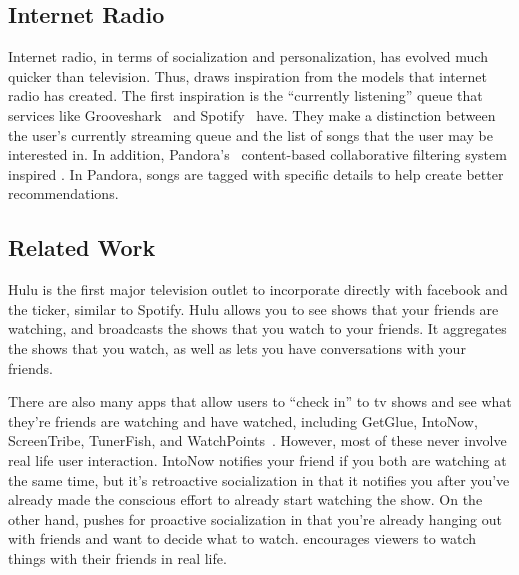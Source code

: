 \subsection{Internet Radio}
Internet radio, in terms of socialization and personalization, has
evolved much quicker than television.  Thus, {\sys} draws inspiration
from the models that internet radio has created.  The first
inspiration is the “currently listening” queue that services like
Grooveshark~\cite{grooveshark} and Spotify~\cite{spotify} have.  They
make a distinction between the user’s currently streaming queue and
the list of songs that the user may be interested in.  In addition,
Pandora’s~\cite{pandora} content-based collaborative filtering system
inspired {\sys}.  In Pandora, songs are tagged with specific details
to help create better recommendations.

\subsection{Related Work}
Hulu is the first major television outlet to incorporate directly with
facebook and the ticker, similar to Spotify.  Hulu allows you to see
shows that your friends are watching, and broadcasts the shows that
you watch to your friends.  It aggregates the shows that you watch, as
well as lets you have conversations with your friends.

There are also many apps that allow users to “check in” to tv shows
and see what they’re friends are watching and have watched, including
GetGlue, IntoNow, ScreenTribe, TunerFish, and WatchPoints~\cite{chausse}.  
However, most of these never involve real life user
interaction.  IntoNow notifies your friend if you both are watching at
the same time, but it’s retroactive socialization in that it notifies
you after you’ve already made the conscious effort to already start
watching the show.  On the other hand, {\sys} pushes for proactive
socialization in that you’re already hanging out with friends and want
to decide what to watch.  {\sys} encourages viewers to watch things
with their friends in real life.
